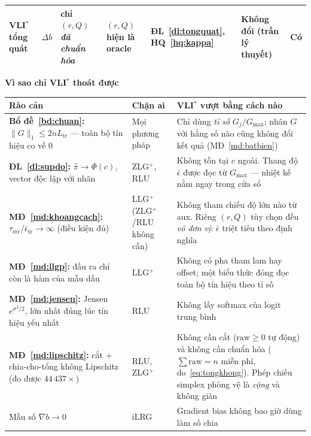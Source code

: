 \documentclass[11pt]{article}
\theoremstyle{remark}
\begin{document}
\begin{landscape}
\begin{tabular}{@{}l l l p{3.8cm} l p{3.8cm} c@{}}
VLI$^*$ tổng quát & $\Delta b$ & chỉ $(r,Q)$ \emph{đã chuẩn hóa} &
$(r,Q)$ hiện là oracle & ĐL~\ref{dl:tongquat}, HQ~\ref{hq:kappa} &
\textbf{Không đổi} (trần lý thuyết) & Có \\
\bottomrule
\end{tabular}

\vspace{1.4em}
\noindent\normalsize\textbf{Vì sao chỉ VLI$^*$ thoát được}

\vspace{0.5em}
\footnotesize
\noindent
\begin{tabular}{@{}p{4.6cm} p{3.6cm} p{12.4cm}@{}}
\toprule
\textbf{Rào cản} & \textbf{Chặn ai} & \textbf{VLI$^*$ vượt bằng cách nào} \\
\midrule
\textbf{Bổ đề~\ref{bd:chuan}:} $\|G\|_1\le 2nL_{\text{tr}}$ --- toàn bộ tín hiệu co về 0 &
Mọi phương pháp &
Chỉ dùng \emph{tỉ số} $G_j/G_{\max}$; nhân $G$ với hằng số nào cũng không đổi kết quả (MĐ~\ref{md:batbien}) \\

\textbf{ĐL~\ref{dl:supdo}:} $\widehat\pi\to\Phi(c)$, vector độc lập với nhãn &
ZLG$^+$, RLU &
Không tồn tại $c$ ngoài. Thang độ $\bar\epsilon$ được đọc từ $G_{\max}$ --- nhiệt kế nằm ngay trong cửa sổ \\

\textbf{MĐ~\ref{md:khoangcach}:} $\tau_{\text{err}}/\bar\epsilon_{\text{tr}}\to\infty$ (điều kiện đủ) &
LLG$^+$ (ZLG$^+$/RLU không cần) &
Không tham chiếu độ lớn nào từ aux. Riêng $(r,Q)$ tùy chọn đều \emph{vô đơn vị}: $\bar\epsilon$ triệt tiêu theo định nghĩa \\

\textbf{MĐ~\ref{md:llgp}:} đầu ra chỉ còn là hàm của mẫu dấu &
LLG$^+$ &
Không có pha tham lam hay offset; một biểu thức đóng đọc toàn bộ tín hiệu theo tỉ số \\

\textbf{MĐ~\ref{md:jensen}:} Jensen $e^{\sigma^2/2}$, lớn nhất đúng lúc tín hiệu yếu nhất &
RLU & Không lấy softmax của logit trung bình \\

\textbf{MĐ~\ref{md:lipschitz}:} cắt + chia-cho-tổng không Lipschitz (đo được $44\,437\times$) &
RLU, ZLG$^+$ &
Không cần cắt ($\mathrm{raw}\ge0$ tự động) và không cần chuẩn hóa ($\sum\mathrm{raw}=n$ miễn phí, do~\eqref{eq:tongkhong}). Phép chiếu simplex phòng vệ là \emph{cộng} và không giãn \\

Mẫu số $\nabla b\to0$ & iLRG & Gradient bias không bao giờ dùng làm số chia \\


\end{tabular}
\end{landscape}
\end{document}
